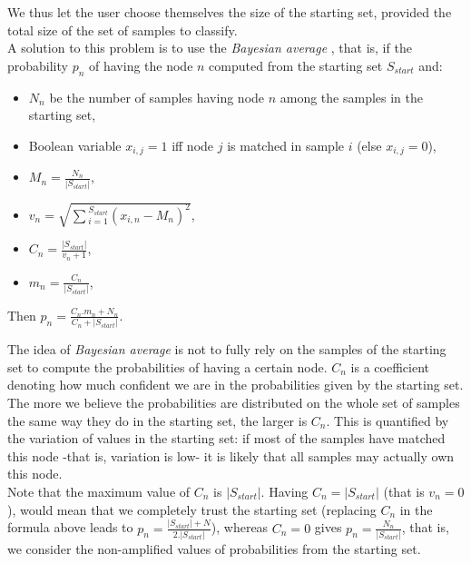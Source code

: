 \documentclass{report}
\begin{document}
We thus let the user choose themselves the size of the starting set, provided the total size of the set of samples to classify.\\

A solution to this problem is to use the \emph{Bayesian average} \cite{BayesianRating}, that is, if the probability $p_{n}$ of having the node $n$ computed from the starting set $S_{start}$ and:

\begin{itemize}
\item $N_{n}$ be the number of samples having node $n$ among the samples in the starting set,
\item Boolean variable $x_{i,j} = 1$ iff node $j$ is matched in sample $i$ (else $x_{i,j} = 0$),
\item $M_{n} = \frac{N_{n}}{|S_{start}|}$,
\item $v_{n} = \sqrt{\sum{_{i=1}^{S_{start}}}{(x_{i,n} - M_{n})^{2}}}$,
\item $C_{n} = \frac{|S_{start}|}{v_{n} + 1}$,
\item $m_{n} = \frac{C_{n}}{|S_{start}|}$,
\end{itemize}

\begin{center}
Then $p_{n} = \frac{C_{n}.m_{n} + N_{n}}{C_{n} + |S_{start}|}$.\\
\end{center}

The idea of \emph{Bayesian average} is not to fully rely on the samples of the starting set to compute the probabilities of having a certain node. $C_{n}$ is a coefficient denoting how much confident we are in the probabilities given by the starting set. The more we believe the probabilities are distributed on the whole set of samples the same way they do in the starting set, the larger is $C_{n}$. This is quantified by the variation of values in the starting set: if most of the samples have matched this node -that is, variation is low- it is likely that all samples may actually own this node.\\

Note that the maximum value of $C_{n}$ is $|S_{start}|$. Having $C_{n} = |S_{start}|$ (that is $v_{n} = 0$), would mean that we completely trust the starting set (replacing $C_{n}$ in the formula above leads to $p_{n} = \frac{|S_{start}| + N}{2.|S_{start}|}$), whereas $C_{n} = 0$ gives $p_{n} = \frac{N_{n}}{|S_{start}|}$, that is, we consider the non-amplified values of probabilities from the starting set.\\
\end{document}
